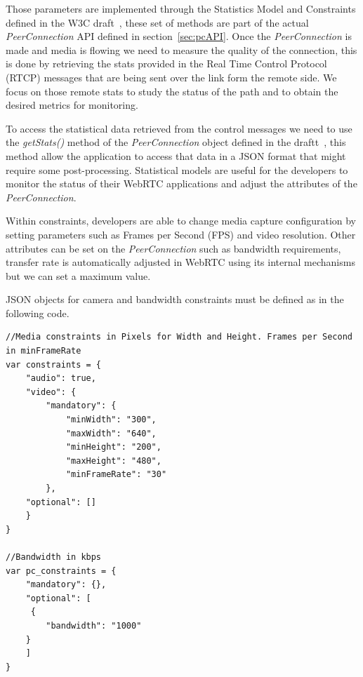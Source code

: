 Those parameters are implemented through the Statistics Model and Constraints defined in the W3C draft~\cite{editorWebRTCdraft}, these set of methods are part of the actual {\it PeerConnection} API defined in section~\ref{sec:pcAPI}. Once the {\it PeerConnection} is made and media is flowing we need to measure the quality of the connection, this is done by retrieving the stats provided in the Real Time Control Protocol (RTCP)  messages that are being sent over the link form the remote side. We focus on those remote stats to study the status of the path and to obtain the desired metrics for monitoring. 


To access the statistical data retrieved from the control messages we need to use the {\it getStats()} method of the {\it PeerConnection} object defined in the draftt~\cite{editorWebRTCdraft}, this method allow the application to access that data in a JSON format that might require some post-processing. Statistical models are useful for the developers to monitor the status of their WebRTC applications and adjust the attributes of the {\it PeerConnection}. 

Within constraints, developers are able to change media capture configuration by setting parameters such as Frames per Second (FPS)  and video resolution. Other attributes can be set on the {\it PeerConnection} such as bandwidth requirements, transfer rate is automatically adjusted in WebRTC using its internal mechanisms but we can set a maximum value. 

JSON objects for camera and bandwidth constraints must be defined as in the following code.

\lstset{language=JavaScript}
\begin{lstlisting}[caption=JSON objects for constraints attributes in WebRTC]
//Media constraints in Pixels for Width and Height. Frames per Second in minFrameRate
var constraints = {
	"audio": true,
 	"video": {
  		"mandatory": {
   			"minWidth": "300",
   			"maxWidth": "640",
   			"minHeight": "200",
   			"maxHeight": "480",
   			"minFrameRate": "30"
  		},
  	"optional": []
 	}
}

//Bandwidth in kbps
var pc_constraints = {
	"mandatory": {},
 	"optional": [
 	 {
   		"bandwidth": "1000"
  	}
 	]
}
\end{lstlisting}

